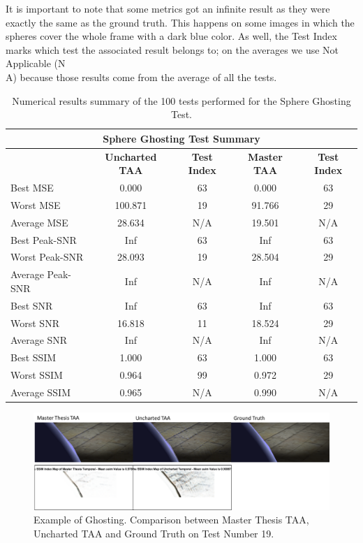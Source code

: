 \documentclass[pregrado]{tesis-usb} %
\begin{document}
It is important to note that some metrics got an infinite result as they were exactly the same as the ground truth. This happens on some images in which the spheres cover the whole frame with a dark blue color. As well, the Test Index marks which test the associated result belongs to; on the averages we use Not Applicable (N\\A) because those results come from the average of all the tests. 
\begin{table}[H]
	\small
	\centering
	\caption{Numerical results summary of the 100 tests performed for the Sphere Ghosting Test.}
	\begin{tabular}{|l|c|c|c|c|}
		\hline
		\multicolumn{5}{|c|}{\textbf{Sphere Ghosting Test Summary}} \\
		\hline
		\multicolumn{1}{|c|}{\textbf{\diagbox{Tests}{AA}}} & \textbf{Uncharted TAA} & \textbf{Test Index} & \textbf{Master TAA} & \textbf{Test Index} \\
		\hline
		Best MSE & 0.000 & 63 & 0.000 & 63 \\
		\hline
		Worst MSE & 100.871 & 19 & 91.766 & 29 \\
		\hline
		Average MSE & 28.634 & N/A   & 19.501 & N/A \\
		\hline
		Best Peak-SNR & Inf   & 63 & Inf   & 63 \\
		\hline
		Worst Peak-SNR & 28.093 & 19 & 28.504 & 29 \\
		\hline
		Average Peak-SNR  & Inf   & N/A   & Inf   & N/A \\
		\hline
		Best SNR & Inf   & 63 & Inf   & 63 \\
		\hline
		Worst SNR & 16.818 & 11 & 18.524 & 29 \\
		\hline
		Average SNR  & Inf   & N/A   & Inf   & N/A \\
		\hline
		Best SSIM & 1.000 & 63 & 1.000 & 63 \\
		\hline
		Worst SSIM & 0.964 & 99 & 0.972 & 29 \\
		\hline
		Average SSIM & 0.965 & N/A   & 0.990 & N/A \\
		\hline
	\end{tabular}%
	\label{tab:sphere_ghosting}%
\end{table}%

\begin{figure}[H]
	\centering
	\includegraphics[scale=0.8]{images/results/sphere_ghosting.png}
	\caption{Example of Ghosting. Comparison between Master Thesis TAA, Uncharted TAA and Ground Truth on Test Number 19.}\label{fig:sphere_ghosting}
\end{figure}
\end{document}
